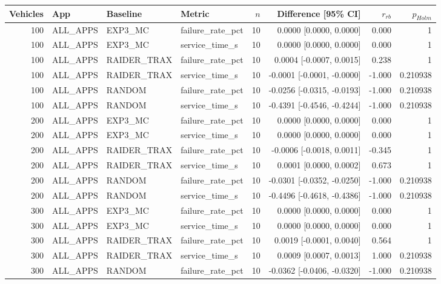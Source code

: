 \begin{tabular}{rlllrrrr}
\hline
Vehicles & App & Baseline & Metric & $n$ & Difference [95\% CI] & $r_{rb}$ & $p_{Holm}$ \\
\hline
100 & ALL\_APPS & EXP3\_MC & failure\_rate\_pct & 10 & 0.0000 [0.0000, 0.0000] & 0.000 & 1 \\
100 & ALL\_APPS & EXP3\_MC & service\_time\_s & 10 & 0.0000 [0.0000, 0.0000] & 0.000 & 1 \\
100 & ALL\_APPS & RAIDER\_TRAX & failure\_rate\_pct & 10 & 0.0004 [-0.0007, 0.0015] & 0.238 & 1 \\
100 & ALL\_APPS & RAIDER\_TRAX & service\_time\_s & 10 & -0.0001 [-0.0001, -0.0000] & -1.000 & 0.210938 \\
100 & ALL\_APPS & RANDOM & failure\_rate\_pct & 10 & -0.0256 [-0.0315, -0.0193] & -1.000 & 0.210938 \\
100 & ALL\_APPS & RANDOM & service\_time\_s & 10 & -0.4391 [-0.4546, -0.4244] & -1.000 & 0.210938 \\
200 & ALL\_APPS & EXP3\_MC & failure\_rate\_pct & 10 & 0.0000 [0.0000, 0.0000] & 0.000 & 1 \\
200 & ALL\_APPS & EXP3\_MC & service\_time\_s & 10 & 0.0000 [0.0000, 0.0000] & 0.000 & 1 \\
200 & ALL\_APPS & RAIDER\_TRAX & failure\_rate\_pct & 10 & -0.0006 [-0.0018, 0.0011] & -0.345 & 1 \\
200 & ALL\_APPS & RAIDER\_TRAX & service\_time\_s & 10 & 0.0001 [0.0000, 0.0002] & 0.673 & 1 \\
200 & ALL\_APPS & RANDOM & failure\_rate\_pct & 10 & -0.0301 [-0.0352, -0.0250] & -1.000 & 0.210938 \\
200 & ALL\_APPS & RANDOM & service\_time\_s & 10 & -0.4496 [-0.4618, -0.4386] & -1.000 & 0.210938 \\
300 & ALL\_APPS & EXP3\_MC & failure\_rate\_pct & 10 & 0.0000 [0.0000, 0.0000] & 0.000 & 1 \\
300 & ALL\_APPS & EXP3\_MC & service\_time\_s & 10 & 0.0000 [0.0000, 0.0000] & 0.000 & 1 \\
300 & ALL\_APPS & RAIDER\_TRAX & failure\_rate\_pct & 10 & 0.0019 [-0.0001, 0.0040] & 0.564 & 1 \\
300 & ALL\_APPS & RAIDER\_TRAX & service\_time\_s & 10 & 0.0009 [0.0007, 0.0013] & 1.000 & 0.210938 \\
300 & ALL\_APPS & RANDOM & failure\_rate\_pct & 10 & -0.0362 [-0.0406, -0.0320] & -1.000 & 0.210938 \\

\end{tabular}
